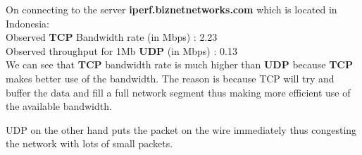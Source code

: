 \documentclass{article}
\theoremstyle{remark}
\newcommand{\tbf}[1]{\textbf{#1}}
\begin{document}
On connecting to the server \tbf{iperf.biznetnetworks.com} which is located in Indonesia: \\
Observed \tbf{TCP} Bandwidth rate (in Mbps) : 2.23  \\
Observed throughput for 1Mb \tbf{UDP} (in Mbps) : 0.13 \\

We can see that \tbf{TCP} bandwidth rate is much higher than \tbf{UDP} because \tbf{TCP} 
makes better use of the bandwidth.
The reason is because TCP will try and buffer the data and fill a full network segment thus making more efficient use of the available bandwidth.

UDP on the other hand puts the packet on the wire immediately thus congesting the network with lots of small packets.
\end{document}
